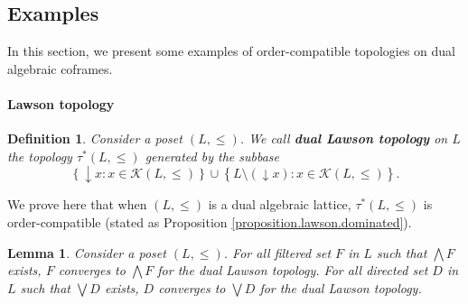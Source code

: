 \documentclass{article}
\newtheorem{lemma}[theorem]{Lemma}
\newtheorem{definition}[theorem]{Definition}
\begin{document}


\subsection{Examples\label{section.ex.densely.dominated}}

In this section, we present some examples of %
{order-compatible topologies on dual algebraic coframes}. 

\paragraph{Lawson topology}



\begin{definition}
    {Consider a poset $(L,\le)$.} We call \textbf{dual Lawson topology} on $L$ the topology 
    $\tau^*(L,\le)$ generated by the subbase 
    \[\left\{\mathop{\downarrow} x : x \in \mathcal{K}(L,\le)\right\} \cup \left\{L \setminus (\mathop{\downarrow} x) : x \in \mathcal{K}(L,\le)\right\}.\]
\end{definition}

We prove here that {when $(L,\le)$ is a dual algebraic lattice,} 
{$\tau^*(L,\le)$ is order-compatible} (stated as Proposition \ref{proposition.lawson.dominated}).

\begin{lemma}\label{lemma.conv.filtered.set}
    {Consider a poset $(L,\le)$.} For all filtered set $F$ in $L$ such that $\bigwedge F$ exists, $F$ converges to $\bigwedge F$ for the dual Lawson topology. For all directed set $D$ in $L$ such that $\bigvee D$ exists, $D$ converges to $\bigvee D$ for the dual Lawson topology.
\end{lemma}
\end{document}
